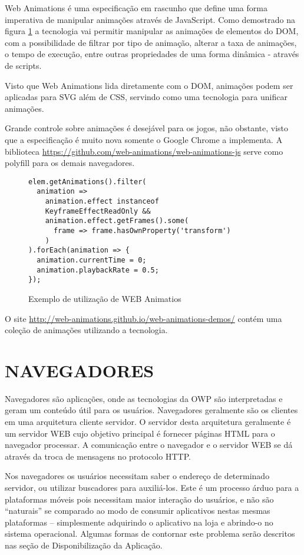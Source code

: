 Web Animations é uma especificação em rascunho que define uma forma
imperativa de manipular animações através de JavaScript. Como
demostrado na figura \ref{fig:webAnimations} a tecnologia vai permitir
manipular as animações de elementos do DOM, com a possibilidade de
filtrar por tipo de animação, alterar a taxa de animações, o tempo
de execução, entre outras propriedades de uma forma dinâmica -
através de scripts.

Visto que Web Animations lida diretamente com o DOM, animações podem
ser aplicadas para SVG além de CSS, servindo como uma tecnologia para
unificar animações.

Grande controle sobre animações é desejável para os
jogos, não obstante, visto que a especificação é muito
nova somente o Google Chrome a implementa. A biblioteca
\url{https://github.com/web-animations/web-animations-js} serve como
polyfill para os demais navegadores.

\begin{figure}[H]
    \centering
    \begin{verbatim}
elem.getAnimations().filter(
  animation =>
    animation.effect instanceof 
    KeyframeEffectReadOnly &&
    animation.effect.getFrames().some(
      frame => frame.hasOwnProperty('transform')
    )
).forEach(animation => {
  animation.currentTime = 0;
  animation.playbackRate = 0.5;
});
    \end{verbatim}
	\caption{Exemplo de utilização de WEB Animatios}
    \label{fig:webAnimations}
\end{figure}

O site \url{http://web-animations.github.io/web-animations-demos/} contém uma
coleção de animações utilizando a tecnologia.

\section{NAVEGADORES}
Navegadores são aplicações, onde as tecnologias da OWP são
interpretadas e geram um conteúdo útil para os usuários. Navegadores
geralmente são os clientes em uma arquitetura cliente servidor. O
servidor desta arquitetura geralmente é um servidor WEB cujo objetivo
principal é fornecer páginas HTML para o navegador processar. A
comunicação entre o navegador e o servidor WEB se dá através da troca de
mensagens no protocolo HTTP.

Nos navegadores os usuários necessitam saber o endereço de determinado
servidor, ou utilizar buscadores para auxiliá-los. Este é um processo
árduo para a plataformas móveis pois necessitam maior interação do
usuários, e não são “naturais” se comparado ao modo de consumir
aplicativos nestas mesmas plataformas – simplesmente adquirindo
o aplicativo na loja e abrindo-o no sistema operacional. Algumas
formas de contornar este problema serão descritos nas seção de
Disponibilização da Aplicação.

